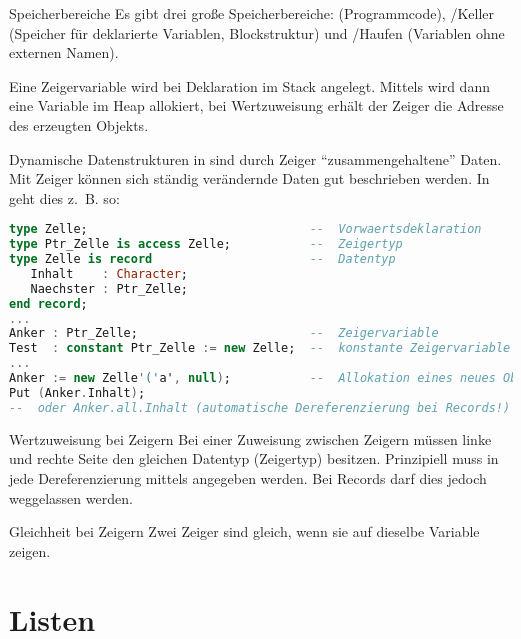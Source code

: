 \begin{Def}{Speicherbereiche}
    Es gibt drei große Speicherbereiche: 
    (Programmcode), /Keller (Speicher für deklarierte Variablen,
    Blockstruktur) und /Haufen (Variablen ohne externen Namen).

    Eine Zeigervariable wird bei Deklaration im Stack angelegt. Mittels
     wird dann eine Variable im Heap allokiert, bei Wertzuweisung
    erhält der Zeiger die Adresse des erzeugten Objekts.
\end{Def}

\begin{Def}{Dynamische Datenstrukturen in \Ada{}}
     sind durch Zeiger
    "`zusammengehaltene"' Daten.
    Mit Zeiger können sich ständig verändernde Daten gut beschrieben werden.
    In \Ada{} geht dies z.~B. so:
\begin{lstlisting}[language=ada]
type Zelle;                               --  Vorwaertsdeklaration
type Ptr_Zelle is access Zelle;           --  Zeigertyp
type Zelle is record                      --  Datentyp
   Inhalt    : Character;
   Naechster : Ptr_Zelle;
end record;
...
Anker : Ptr_Zelle;                        --  Zeigervariable
Test  : constant Ptr_Zelle := new Zelle;  --  konstante Zeigervariable
...
Anker := new Zelle'('a', null);           --  Allokation eines neues Objekts, Nullpointer
Put (Anker.Inhalt);
--  oder Anker.all.Inhalt (automatische Dereferenzierung bei Records!)
\end{lstlisting}
\end{Def}

\begin{Def}{Wertzuweisung bei Zeigern}
    Bei einer Zuweisung zwischen Zeigern müssen linke und rechte Seite den
    gleichen Datentyp (Zeigertyp) besitzen.
    Prinzipiell muss in \Ada{} jede Dereferenzierung mittels 
    angegeben werden.
    Bei Records darf dies jedoch weggelassen werden.
\end{Def}

\begin{Def}{Gleichheit bei Zeigern}
    Zwei Zeiger sind gleich, wenn sie auf dieselbe Variable zeigen.
\end{Def}

\section{%
    Listen%
}

